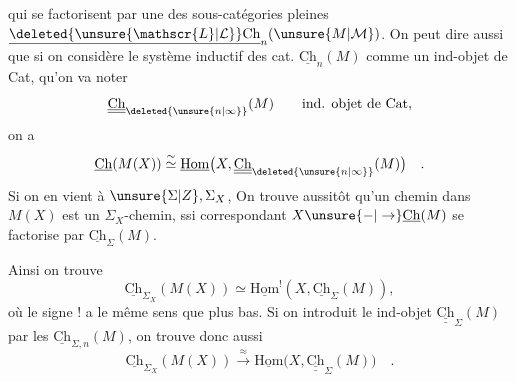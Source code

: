 qui se factorisent par une des sous-catégories
pleines $\underline{\deleted{\unsure{\mathscr{L}|\mathcal{L}}}\mathrm{Ch}}_n(\unsure{M|\mathcal{M}})$. On peut dire aussi que
si on considère le système inductif des
cat. $\underline{\mathrm{Ch}}_n(M)$ comme un ind-objet
de Cat,  qu'on va noter
\[
\underline{\underline{\mathrm{Ch}}}_{\deleted{\unsure{n|\infty}}}(M)
\qquad\text{ind. objet de Cat},
\]
on a
\[
\underline{\mathrm{Ch}}(M(X))\overset{\sim}{\simeq}
\underline{\mathrm{Hom}}\bigl(X,\underline{\underline{\mathrm{Ch}}}_{\deleted{\unsure{n|\infty}}}(M)\bigr)\quad .
\]
Si on en vient  à $\unsure{\Sigma|Z},\Sigma_X$, On trouve
aussitôt qu'un chemin dans $M(X)$ est un
$\Sigma_X$-chemin, ssi   correspondant
$X\unsure{\mathord{-}|\to}\underline{\mathrm{Ch}}(M)$ se factorise par $\underline{\mathrm{Ch}}_\Sigma(M)$.

Ainsi on trouve
\[
\underline{\mathrm{Ch}}_{\Sigma_X}(M(X))\simeq\underline{\mathrm{Hom}}^!(X,\underline{\mathrm{Ch}}_\Sigma(M)),
\]
où le signe $!$ a le même sens que plus bas.
Si on introduit le ind-objet $\underline{\underline{\mathrm{Ch}}}_\Sigma(M)$
 par les $\underline{\mathrm{Ch}}_{\Sigma,n}(M)$, on trouve donc
aussi
\[
\underline{\mathrm{Ch}}_{\Sigma_X}(M(X))\xrightarrow{\approx}
\underline{\mathrm{Hom}}\bigl(X,\underline{\underline{\mathrm{Ch}}}_\Sigma(M)\bigr)\quad .
\]
